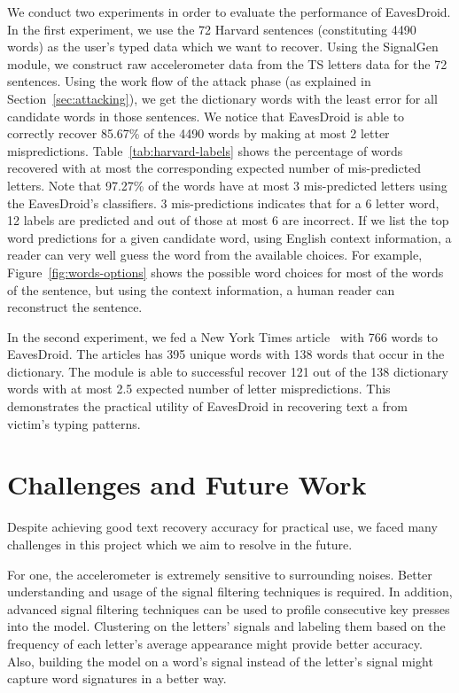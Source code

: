 \documentclass[11pt,conference]{IEEEtran}
\begin{document}
We conduct two experiments in order to evaluate the performance of EavesDroid.
In the first experiment, we use the 72 Harvard sentences (constituting 4490 words) as the user's typed data
which we want to recover. Using the SignalGen module, we construct raw accelerometer
data from the TS letters data for the 72 sentences. Using the work flow
of the attack phase (as explained in Section~\ref{sec:attacking}), we get the dictionary
words with the least error for all candidate words in those sentences. We notice that
EavesDroid is able to correctly recover 85.67\% of the 4490 words by making at most 2 letter
mispredictions. Table~\ref{tab:harvard-labels}
shows the percentage of words recovered with at most the corresponding expected number of mis-predicted letters.
Note that 97.27\% of the words have at most 3 mis-predicted letters using
the EavesDroid's classifiers. 3 mis-predictions indicates that for a 6 letter word, 12 labels are predicted and out of
those at most 6 are incorrect. If we list the top word predictions for a given candidate word,
using English context information, a reader can very well guess the word from the available
choices. For example, Figure~\ref{fig:words-options} shows the possible word choices
for most of the words of the sentence, but using the context information, a human reader
can reconstruct the sentence.

In the second experiment, we fed a New York Times article~\cite{bats-nytimes} with 766 words
to EavesDroid. The articles has 395 unique words with 138 words that occur in the dictionary.
The module is able to successful recover 121 out of the 138 dictionary words with at most 2.5 expected
number of letter mispredictions. This demonstrates the practical utility of EavesDroid in recovering text a from victim's typing patterns.

\section{Challenges and Future Work}
\noindent 
Despite achieving good text recovery accuracy for practical use, we faced many challenges in
this project which we aim to resolve in the future. 

For one, the accelerometer is extremely sensitive to surrounding noises. Better understanding and usage of the signal
filtering techniques is required. In addition, advanced signal filtering techniques can be used to
profile consecutive key presses into the model. Clustering on the letters' signals and labeling them based on the frequency of
each letter's average appearance might provide better accuracy. Also, building the model on a word's signal
instead of the letter's signal might capture word signatures in a better way.
\end{document}
